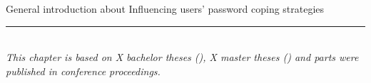 General introduction about Influencing users' password coping strategies

\vspace{10pt}

\noindent\rule{0.38\textwidth}{0.5pt}\\

\textit{This chapter is based on X bachelor theses (\todo ), X master theses (\todo ) and parts were published in conference proceedings. \cite{Seitz2017Emojipasswords}}